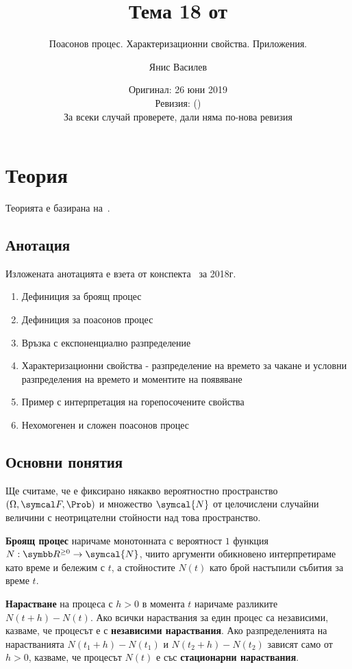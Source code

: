 \documentclass[numbers=endperiod, bibliography=totocnumbered]{scrartcl}
\title{Тема 18 от \URL{https://github.com/v--/se2018}}
\subtitle{Поасонов процес. Характеризационни свойства. Приложения.}
\author{Янис Василев}
\date{Оригинал: 26 юни 2019 \\ Ревизия: \gitAbbrevHash{} (\gitAuthorDate) \\ За всеки случай проверете, дали няма по-нова ревизия}
\begin{document}
\maketitle

\section{Теория}

Теорията е базирана на~\cite{Lectures}.

\subsection{Анотация}

Изложената анотацията е взета от конспекта~\cite{Syllabus} за 2018г.

\begin{enumerate}
  \item Дефиниция за броящ процес
  \item Дефиниция за поасонов процес
  \item Връзка с експоненциално разпределение
  \item Характеризационни свойства - разпределение на времето за чакане и условни разпределения на времето и моментите на появяване
  \item Пример с интерпретация на горепосочените свойства
  \item Нехомогенен и сложен поасонов процес
\end{enumerate}

\subsection{Основни понятия}

Ще считаме, че е фиксирано някакво вероятностно пространство \( (\Omega, \F, \Prob) \) и множество \( \symcal{N} \) от целочислени случайни величини с неотрицателни стойности над това пространство.

\begin{definition}
  \textbf{Броящ процес} наричаме монотонната с вероятност \( 1 \) функция \( N: \RNNeg \to \symcal{N} \), чиито аргументи обикновено интерпретираме като време и бележим с \( t \), а стойностите \( N(t) \) като брой настъпили събития за време \( t \).

  \textbf{Нарастване} на процеса с \( h > 0 \) в момента \( t \) наричаме разликите \( N(t+h) - N(t) \). Ако всички нараствания за един процес са независими, казваме, че процесът е с \textbf{независими нараствания}. Ако разпределенията на нарастванията \( N(t_1+h) - N(t_1) \) и \( N(t_2+h) - N(t_2) \) зависят само от \( h>0 \), казваме, че процесът \( N(t) \) е със \textbf{стационарни нараствания}.
\end{definition}
\end{document}
